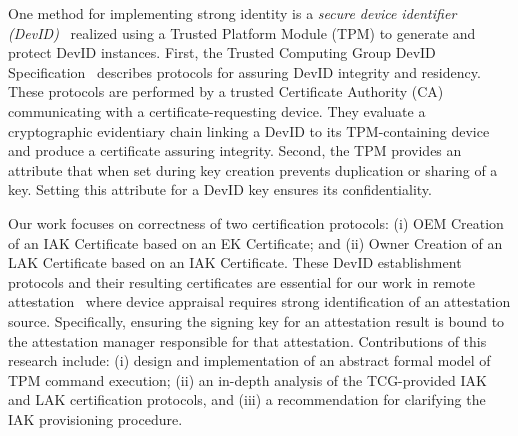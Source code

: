 \documentclass[runningheads]{llncs}
\begin{document}
One method for implementing strong identity is a \emph{secure device
  identifier (DevID)}~\citep{DevIDSpec-IEEE} realized using a Trusted
Platform Module (TPM) to generate and protect DevID instances.  First,
the Trusted Computing Group DevID Specification~\citep{DevIDSpec-TCG}
describes protocols for assuring DevID integrity and residency. These
protocols are performed by a trusted Certificate Authority (CA)
communicating with a certificate-requesting device.  They evaluate a
cryptographic evidentiary chain linking a DevID to its TPM-containing
device and produce a certificate assuring integrity.  Second, the TPM
provides an attribute that when set during key creation
prevents duplication or sharing of a key. Setting this attribute for
a DevID key ensures its confidentiality.

Our work focuses on correctness of two certification protocols:
(i) OEM Creation of an IAK Certificate based on an EK Certificate; and
(ii) Owner Creation of an LAK Certificate based on an IAK
Certificate. These DevID establishment protocols and their resulting
certificates are essential for our work in remote
attestation~\citep{Coker::Principles-of-R,petz2022innovations} where
device appraisal requires strong identification of an attestation
source. Specifically, ensuring the signing key for an attestation
result is bound to the attestation manager responsible for that
attestation.  Contributions of this research include: (i) design and
implementation of an abstract formal model of TPM command execution;
(ii) an in-depth analysis of the TCG-provided IAK and LAK
certification protocols, and (iii) a recommendation for clarifying the
IAK provisioning procedure.
\end{document}
